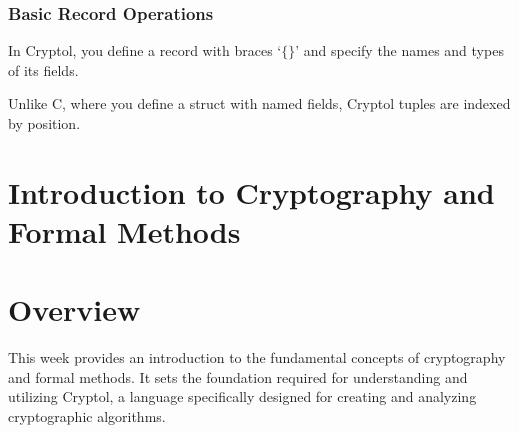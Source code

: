 \subsubsection{Basic Record Operations}
\begin{tcolorbox}[colframe=defcolor,title={\color{white}\bf Record}]
In Cryptol, you define a record with braces `\texttt{$\{\}$}' and specify the names and types of its fields.
\end{tcolorbox}
\begin{remark}
	Unlike C, where you define a struct with named fields, Cryptol tuples are indexed by position.
\end{remark}



















\newpage
\iffalse
%
%
%
%
\section{Introduction to Cryptography and Formal Methods}
%
\section*{Overview}
This week provides an introduction to the fundamental concepts of cryptography and formal methods. It sets the foundation required for understanding and utilizing Cryptol, a language specifically designed for creating and analyzing cryptographic algorithms.


